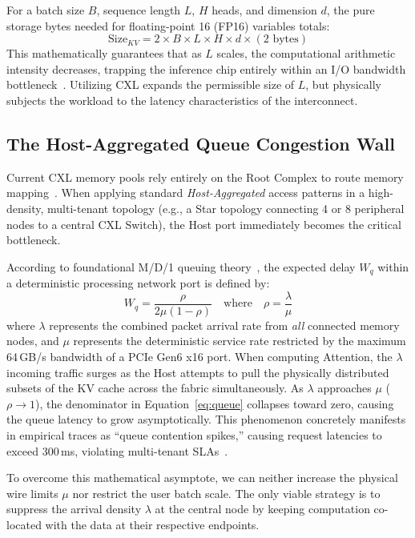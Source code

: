 \documentclass[10pt,conference]{IEEEtran}
\begin{document}
For a batch size $B$, sequence length $L$, $H$ heads, and dimension $d$, the pure storage bytes needed for floating-point 16 (FP16) variables totals:
\begin{equation}
    \text{Size}_{KV} = 2 \times B \times L \times H \times d \times (\text{2 bytes})
\end{equation}
This mathematically guarantees that as $L$ scales, the computational arithmetic intensity decreases, trapping the inference chip entirely within an I/O bandwidth bottleneck~\cite{flashattn, infinigen}. Utilizing CXL expands the permissible size of $L$, but physically subjects the workload to the latency characteristics of the interconnect.

\subsection{The Host-Aggregated Queue Congestion Wall}
Current CXL memory pools rely entirely on the Root Complex to route memory mapping~\cite{cxl_pond, tpp}. When applying standard \textit{Host-Aggregated} access patterns in a high-density, multi-tenant topology (e.g., a Star topology connecting 4 or 8 peripheral nodes to a central CXL Switch), the Host port immediately becomes the critical bottleneck.

According to foundational M/D/1 queuing theory~\cite{kleinrock}, the expected delay $W_q$ within a deterministic processing network port is defined by:
\begin{equation}
\label{eq:queue}
W_q = \frac{\rho}{2\mu(1 - \rho)} \quad \text{where} \quad \rho = \frac{\lambda}{\mu}
\end{equation}
where $\lambda$ represents the combined packet arrival rate from \textit{all} connected memory nodes, and $\mu$ represents the deterministic service rate restricted by the maximum 64\,GB/s bandwidth of a PCIe Gen6 x16 port. 
When computing Attention, the $\lambda$ incoming traffic surges as the Host attempts to pull the physically distributed subsets of the KV cache across the fabric simultaneously. As $\lambda$ approaches $\mu$ ($\rho \to 1$), the denominator in Equation~\ref{eq:queue} collapses toward zero, causing the queue latency to grow asymptotically. This phenomenon concretely manifests in empirical traces as ``queue contention spikes,'' causing request latencies to exceed 300\,ms, violating multi-tenant SLAs~\cite{distserve}.

To overcome this mathematical asymptote, we can neither increase the physical wire limits $\mu$ nor restrict the user batch scale. The only viable strategy is to suppress the arrival density $\lambda$ at the central node by keeping computation co-located with the data at their respective endpoints.
\end{document}
